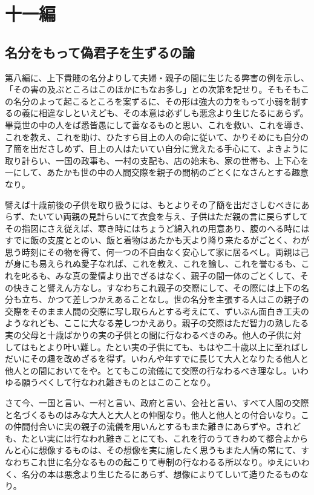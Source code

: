 \documentclass[a4paper, platex, dvipdfmx]{jsarticle}
\begin{document}
\section{十一編}
\subsection{名分をもって偽君子を生ずるの論}
第八編に、上下貴賤の名分よりして夫婦・親子の間に生じたる弊害の例を示し、「その害の及ぶところはこのほかにもなお多し」との次第を記せり。そもそもこの名分のよって起こるところを案ずるに、その形は強大の力をもって小弱を制するの義に相違なしといえども、その本意は必ずしも悪念より生じたるにあらず。畢竟世の中の人をば悉皆愚にして善なるものと思い、これを救い、これを導き、これを教え、これを助け、ひたすら目上の人の命に従いて、かりそめにも自分の了簡を出ださしめず、目上の人はたいてい自分に覚えたる手心にて、よきように取り計らい、一国の政事も、一村の支配も、店の始末も、家の世帯も、上下心を一にして、あたかも世の中の人間交際を親子の間柄のごとくになさんとする趣意なり。

譬えば十歳前後の子供を取り扱うには、もとよりその了簡を出ださしむべきにあらず、たいてい両親の見計らいにて衣食を与え、子供はただ親の言に戻らずしてその指図にさえ従えば、寒き時にはちょうど綿入れの用意あり、腹のへる時にはすでに飯の支度ととのい、飯と着物はあたかも天より降り来たるがごとく、わが思う時刻にその物を得て、何一つの不自由なく安心して家に居るべし。両親は己が身にも易えられぬ愛子なれば、これを教え、これを諭し、これを誉むるも、これを叱るも、みな真の愛情より出でざるはなく、親子の間一体のごとくして、その快きこと譬えん方なし。すなわちこれ親子の交際にして、その際には上下の名分も立ち、かつて差しつかえあることなし。世の名分を主張する人はこの親子の交際をそのまま人間の交際に写し取らんとする考えにて、ずいぶん面白き工夫のようなれども、ここに大なる差しつかえあり。親子の交際はただ智力の熟したる実の父母と十歳ばかりの実の子供との間に行なわるべきのみ。他人の子供に対してはもとより叶い難し。たとい実の子供にても、もはや二十歳以上に至ればしだいにその趣を改めざるを得ず。いわんや年すでに長じて大人となりたる他人と他人との間においてをや。とてもこの流儀にて交際の行なわるべき理なし。いわゆる願うべくして行なわれ難きものとはこのことなり。

さて今、一国と言い、一村と言い、政府と言い、会社と言い、すべて人間の交際と名づくるものはみな大人と大人との仲間なり。他人と他人との付合いなり。この仲間付合いに実の親子の流儀を用いんとするもまた難きにあらずや。されども、たとい実には行なわれ難きことにても、これを行のうてきわめて都合よからんと心に想像するものは、その想像を実に施したく思うもまた人情の常にて、すなわちこれ世に名分なるものの起こりて専制の行なわるる所以なり。ゆえにいわく、名分の本は悪念より生じたるにあらず、想像によりてしいて造りたるものなり。
\end{document}
